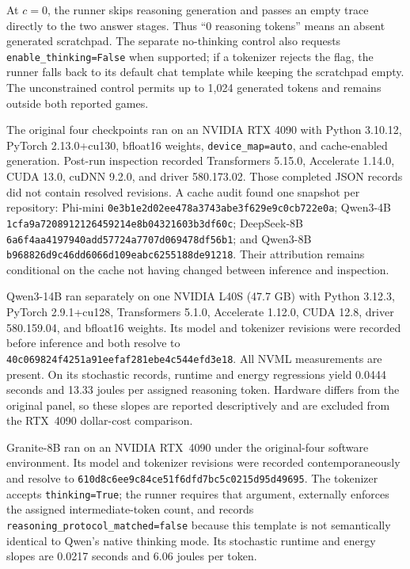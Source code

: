 \documentclass{article}
\begin{document}
At $c=0$, the runner skips reasoning generation and passes an empty trace directly to the two answer stages. Thus ``0 reasoning tokens'' means an absent generated scratchpad. The separate no-thinking control also requests \texttt{enable\_thinking=False} when supported; if a tokenizer rejects the flag, the runner falls back to its default chat template while keeping the scratchpad empty. The unconstrained control permits up to 1,024 generated tokens and remains outside both reported games.



The original four checkpoints ran on an NVIDIA RTX 4090 with Python 3.10.12, PyTorch 2.13.0+cu130, bfloat16 weights, \texttt{device\_map=auto}, and cache-enabled generation. Post-run inspection recorded Transformers 5.15.0, Accelerate 1.14.0, CUDA 13.0, cuDNN 9.2.0, and driver 580.173.02. Those completed JSON records did not contain resolved revisions. A cache audit found one snapshot per repository: Phi-mini \nolinkurl{0e3b1e2d02ee478a3743abe3f629e9c0cb722e0a}; Qwen3-4B \nolinkurl{1cfa9a7208912126459214e8b04321603b3df60c}; DeepSeek-8B \nolinkurl{6a6f4aa4197940add57724a7707d069478df56b1}; and Qwen3-8B \nolinkurl{b968826d9c46dd6066d109eabc6255188de91218}. Their attribution remains conditional on the cache not having changed between inference and inspection.

Qwen3-14B ran separately on one NVIDIA L40S (47.7 GB) with Python 3.12.3, PyTorch 2.9.1+cu128, Transformers 5.1.0, Accelerate 1.12.0, CUDA 12.8, driver 580.159.04, and bfloat16 weights. Its model and tokenizer revisions were recorded before inference and both resolve to \nolinkurl{40c069824f4251a91eefaf281ebe4c544efd3e18}. All NVML measurements are present. On its stochastic records, runtime and energy regressions yield 0.0444 seconds and 13.33 joules per assigned reasoning token. Hardware differs from the original panel, so these slopes are reported descriptively and are excluded from the RTX~4090 dollar-cost comparison.

Granite-8B ran on an NVIDIA RTX~4090 under the original-four software environment. Its model and tokenizer revisions were recorded contemporaneously and resolve to \nolinkurl{610d8c6ee9c84ce51f6dfd7bc5c0215d95d49695}. The tokenizer accepts \texttt{thinking=True}; the runner requires that argument, externally enforces the assigned intermediate-token count, and records \texttt{reasoning\_protocol\_matched=false} because this template is not semantically identical to Qwen's native thinking mode. Its stochastic runtime and energy slopes are 0.0217 seconds and 6.06 joules per token.
\end{document}
